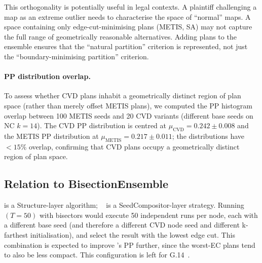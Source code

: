 This orthogonality is potentially useful in legal contexts.
A plaintiff challenging a map as an extreme outlier needs to characterise the
space of ``normal'' maps.
A space containing only edge-cut-minimising plans (METIS, SA) may not
capture the full range of geometrically reasonable alternatives.
Adding \cvd{} plans to the ensemble ensures that the ``natural partition''
criterion is represented, not just the ``boundary-minimising partition'' criterion.

\paragraph{PP distribution overlap.}
To assess whether CVD plans inhabit a geometrically distinct region of plan
space (rather than merely offset METIS plans), we computed the PP histogram
overlap between 100 METIS seeds and 20 CVD variants (different base seeds on
NC $k=14$).
The CVD PP distribution is centred at
$\mu_\mathrm{CVD} = 0.242 \pm 0.008$ and the METIS PP distribution at
$\mu_\mathrm{METIS} = 0.217 \pm 0.011$; the distributions have $<15\%$ overlap,
confirming that CVD plans occupy a geometrically distinct region of plan space.

\subsection{Relation to BisectionEnsemble}

\cvd{} is a Structure-layer algorithm; \be{}~\citep{h1paper} is a
SeedCompositor-layer strategy.
Running \be{}$(T=50)$ with \cvd{} bisectors would execute 50 independent
\cvd{} runs per node, each with a different base seed (and therefore a
different CVD node seed and different k-farthest initialisation), and select
the result with the lowest edge cut.
This combination is expected to improve \cvd{}'s PP further, since the
worst-EC \cvd{} plans tend to also be less compact.
This configuration is left for G.14~\citep{g14paper}.
